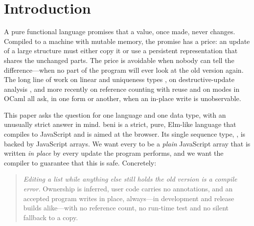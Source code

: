 \section{Introduction}
\label{sec:intro}

A pure functional language promises that a value, once made, never changes. Compiled to a
machine with mutable memory, the promise has a price: an update of a large structure must either
copy it or use a persistent representation that shares the unchanged parts. The price is
avoidable when nobody can tell the difference---when no part of the program will ever look at the
old version again. The long line of work on linear and uniqueness types
\citep{wadler1990linear,wadler1991use,smetsers1994guaranteeing,barendsen1996uniqueness,devries2008simplified},
on destructive-update analysis \citep{wand2001set,cann1990sisal,aspinall2008usage}, and more
recently on reference counting with reuse \citep{ullrich2019beans,reinking2021perceus,lorenzen2023fp2}
and on modes in OCaml \citep{lorenzen2024oxidizing} all ask, in one form or another, when an
in-place write is unobservable.

This paper asks the question for one language and one data type, with an unusually strict
answer in mind. beni is a strict, pure, Elm-like language that compiles to JavaScript and is aimed
at the browser. Its single sequence type, , is backed by JavaScript arrays. We want
every  to be a \emph{plain} JavaScript array that is written \emph{in place} by every
update the program performs, and we want the compiler to guarantee that this is safe. Concretely:

\begin{quote}
\emph{Editing a list while anything else still holds the old version is a compile error.}
Ownership is inferred, user code carries no annotations, and an accepted program writes in place,
always---in development and release builds alike---with no reference count, no run-time test and
no silent fallback to a copy.
\end{quote}

